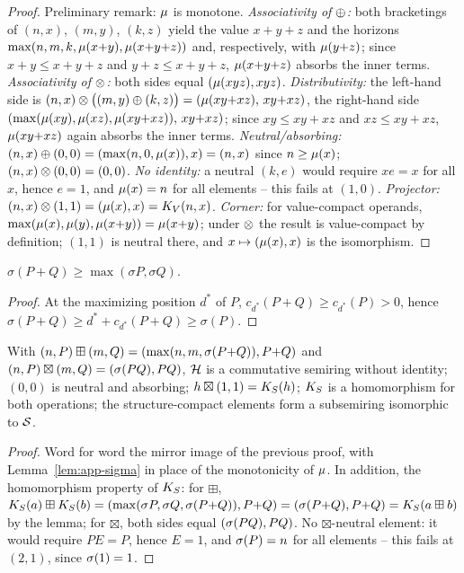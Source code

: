 \begin{proof}
Preliminary remark: $\mu$ is monotone. \emph{Associativity of
$\oplus$:} both bracketings of $(n,x)$, $(m,y)$, $(k,z)$ yield
the value $x{+}y{+}z$ and the horizons
$\max(n,m,k,\mu(x{+}y),\mu(x{+}y{+}z))$ and, respectively, with
$\mu(y{+}z)$; since $x{+}y\le x{+}y{+}z$ and
$y{+}z\le x{+}y{+}z$, $\mu(x{+}y{+}z)$ absorbs the inner terms.
\emph{Associativity of $\otimes$:} both sides equal
$(\mu(xyz),xyz)$.
\emph{Distributivity:} the left-hand side is
$(n,x)\otimes\bigl((m,y)\oplus(k,z)\bigr)
=(\mu(xy{+}xz),\,xy{+}xz)$, the right-hand side
$(\max(\mu(xy),\mu(xz),\mu(xy{+}xz)),\,xy{+}xz)$; since
$xy\le xy{+}xz$ and $xz\le xy{+}xz$, $\mu(xy{+}xz)$ again
absorbs the inner terms.
\emph{Neutral/absorbing:} $(n,x)\oplus(0,0)=(\max(n,0,\mu(x)),x)
=(n,x)$ since $n\ge\mu(x)$; $(n,x)\otimes(0,0)=(0,0)$.
\emph{No identity:} a neutral $(k,e)$ would require $xe=x$ for
all $x$, hence $e=1$, and $\mu(x)=n$ for all elements -- this
fails at $(1,0)$. \emph{Projector:}
$(n,x)\otimes(1,1)=(\mu(x),x)=K_V(n,x)$. \emph{Corner:} for
value-compact operands,
$\max(\mu(x),\mu(y),\mu(x{+}y))=\mu(x{+}y)$; under $\otimes$
the result is value-compact by definition; $(1,1)$ is neutral
there, and $x\mapsto(\mu(x),x)$ is the isomorphism.
\end{proof}

\begin{lemma}\label{lem:app-sigma}
$\sigma(P{+}Q)\ge\max(\sigma P,\sigma Q)$.
\end{lemma}

\begin{proof}
At the maximizing position $d^*$ of $P$,
$c_{d^*}(P{+}Q)\ge c_{d^*}(P)>0$, hence
$\sigma(P{+}Q)\ge d^*+c_{d^*}(P{+}Q)\ge\sigma(P)$.
\end{proof}

\begin{satz}
With $(n,P)\boxplus(m,Q)=(\max(n,m,\sigma(P{+}Q)),P{+}Q)$ and
$(n,P)\boxtimes(m,Q)=(\sigma(PQ),PQ)$, $\mathcal H$ is a commutative
semiring without identity; $(0,0)$ is neutral and absorbing;
$h\boxtimes(1,1)=K_S(h)$; $K_S$ is a homomorphism for both
operations; the structure-compact elements form a subsemiring
isomorphic to $\mathcal S$.
\end{satz}

\begin{proof}
Word for word the mirror image of the previous proof, with
Lemma~\ref{lem:app-sigma} in place of the monotonicity of $\mu$.
In addition, the homomorphism property of $K_S$: for $\boxplus$,
$K_S(a)\boxplus K_S(b)=(\max(\sigma P,\sigma Q,\sigma(P{+}Q)),P{+}Q)
=(\sigma(P{+}Q),P{+}Q)=K_S(a\boxplus b)$ by the lemma; for
$\boxtimes$, both sides equal $(\sigma(PQ),PQ)$. No
$\boxtimes$-neutral element: it would require $PE=P$, hence $E=1$,
and $\sigma(P)=n$ for all elements -- this fails at $(2,1)$,
since $\sigma(1)=1$.
\end{proof}

